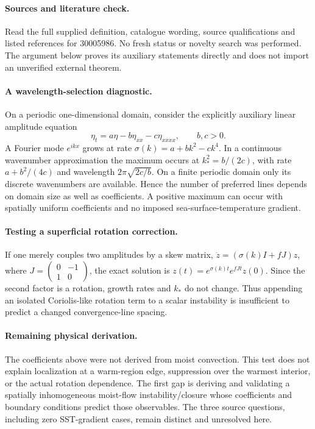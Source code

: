 \documentclass[11pt]{article}
\begin{document}
\paragraph{Sources and literature check.}
Read the full supplied definition, catalogue wording, source qualifications and listed references for 30005986. No fresh status or novelty search was performed. The argument below proves its auxiliary statements directly and does not import an unverified external theorem.

\paragraph{A wavelength-selection diagnostic.} On a periodic one-dimensional domain, consider the explicitly auxiliary linear amplitude equation
\[
 \eta_t=a\eta-b\eta_{xx}-c\eta_{xxxx},\qquad b,c>0.
\]
A Fourier mode \(e^{ikx}\) grows at rate \(\sigma(k)=a+bk^2-ck^4\). In a continuous wavenumber approximation the maximum occurs at \(k_*^2=b/(2c)\), with rate \(a+b^2/(4c)\) and wavelength \(2\pi\sqrt{2c/b}\). On a finite periodic domain only its discrete wavenumbers are available. Hence the number of preferred lines depends on domain size as well as coefficients. A positive maximum can occur with spatially uniform coefficients and no imposed sea-surface-temperature gradient.
\paragraph{Testing a superficial rotation correction.} If one merely couples two amplitudes by a skew matrix, \(\dot z=(\sigma(k)I+fJ)z\), where \(J=\left(\begin{smallmatrix}0&-1\\1&0\end{smallmatrix}\right)\), the exact solution is \(z(t)=e^{\sigma(k)t}e^{fJt}z(0)\). Since the second factor is a rotation, growth rates and \(k_*\) do not change. Thus appending an isolated Coriolis-like rotation term to a scalar instability is insufficient to predict a changed convergence-line spacing.
\paragraph{Remaining physical derivation.} The coefficients above were not derived from moist convection. This test does not explain localization at a warm-region edge, suppression over the warmest interior, or the actual rotation dependence. The first gap is deriving and validating a spatially inhomogeneous moist-flow instability/closure whose coefficients and boundary conditions predict those observables. The three source questions, including zero SST-gradient cases, remain distinct and unresolved here.
\end{document}
